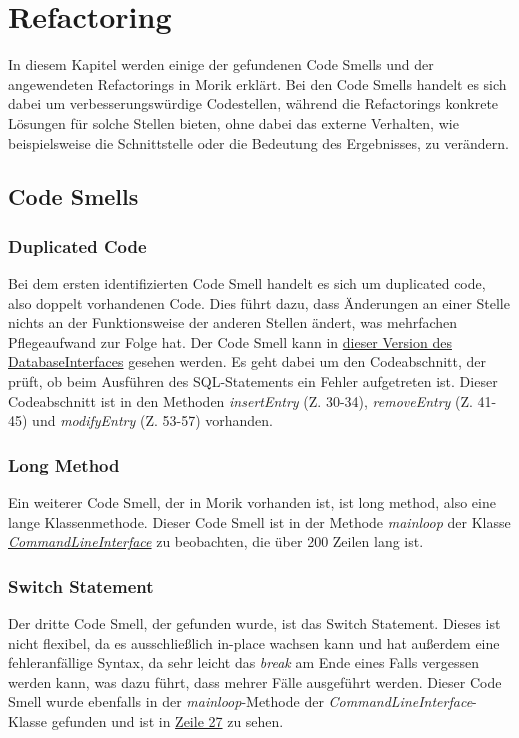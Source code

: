 \chapter{Refactoring}
\label{chap:refactoring}
In diesem Kapitel werden einige der gefundenen Code Smells und der angewendeten Refactorings in Morik erklärt. Bei den Code Smells handelt es sich dabei um verbesserungswürdige Codestellen, während die Refactorings konkrete Lösungen für solche Stellen bieten, ohne dabei das externe Verhalten, wie beispielsweise die Schnittstelle oder die Bedeutung des Ergebnisses, zu verändern.

\section{Code Smells}
\subsection{Duplicated Code}
Bei dem ersten identifizierten Code Smell handelt es sich um duplicated code, also doppelt vorhandenen Code. Dies führt dazu, dass Änderungen an einer Stelle nichts an der Funktionsweise der anderen Stellen ändert, was mehrfachen Pflegeaufwand zur Folge hat. Der Code Smell kann in \href{https://github.com/moorts/Morik/blob/8c90c65347f25b5a5a26f68c66189984dfb0bca6/src/adapters/database/DatabaseInterface.cpp}{dieser Version des DatabaseInterfaces} gesehen werden. Es geht dabei um den Codeabschnitt, der prüft, ob beim Ausführen des SQL-Statements ein Fehler aufgetreten ist. Dieser Codeabschnitt ist in den Methoden \textit{insertEntry} (Z. 30-34), \textit{removeEntry} (Z. 41-45) und \textit{modifyEntry} (Z. 53-57) vorhanden.

\subsection{Long Method}
Ein weiterer Code Smell, der in Morik vorhanden ist, ist long method, also eine lange Klassenmethode. Dieser Code Smell ist in der Methode \textit{mainloop} der Klasse \href{https://github.com/moorts/Morik/blob/main/src/plugins/ui/CommandLineInterface.cpp}{\textit{CommandLineInterface}} zu beobachten, die über 200 Zeilen lang ist.

\subsection{Switch Statement}
Der dritte Code Smell, der gefunden wurde, ist das Switch Statement. Dieses ist nicht flexibel, da es ausschließlich in-place wachsen kann und hat außerdem eine fehleranfällige Syntax, da sehr leicht das \textit{break} am Ende eines Falls vergessen werden kann, was dazu führt, dass mehrer Fälle ausgeführt werden. Dieser Code Smell wurde ebenfalls in der \textit{mainloop}-Methode der \textit{CommandLineInterface}-Klasse gefunden und ist in \href{https://github.com/moorts/Morik/blob/5fad45957d77585d88bf3330cab6004315e6e2e3/src/plugins/ui/CommandLineInterface.cpp#L27}{Zeile 27} zu sehen.

